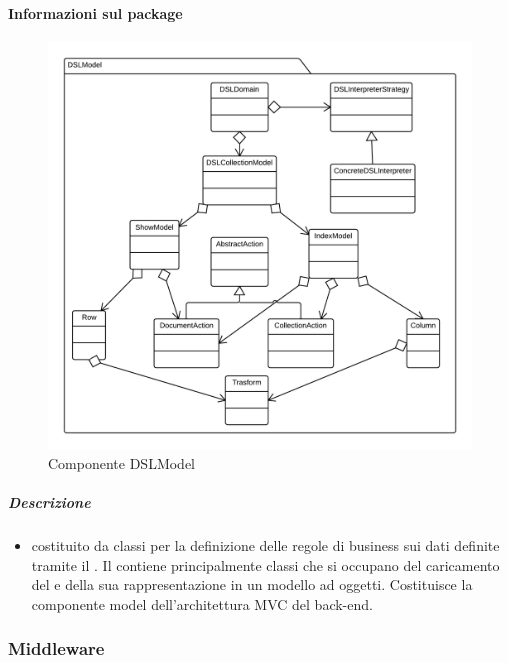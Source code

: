   \paragraph{Informazioni sul package} 
    \begin{figure}[H] 
      \begin{center} 
        \includegraphics[width=\textwidth]{packages/Back-end::Lib::Model::DSLModel.png}  
        \caption{Componente DSLModel}
      \end{center}  
    \end{figure} 
  \subparagraph{Descrizione} 
    \begin{itemize}
    \item[]  costituito da classi per la definizione delle regole di business sui dati definite tramite il  . Il  contiene principalmente classi che si occupano del caricamento del  e della sua rappresentazione in un modello ad oggetti. Costituisce la componente model dell’architettura MVC del back-end.

    \end{itemize} 
  \subsubsection{Middleware}
